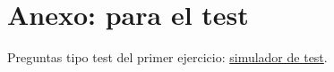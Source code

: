 \documentclass[11pt]{article}
\begin{document}
\section{Anexo: para el test}\label{anexo:test}

\begin{anotaciones}
Preguntas tipo test del primer ejercicio: \href{https://www.victorgutierrezmarcos.es/oposicion/temario/primer-ejercicio/test/simulador.html?tema=3.B.25}{simulador de test}.
\end{anotaciones}

\bibliografia
\end{document}
